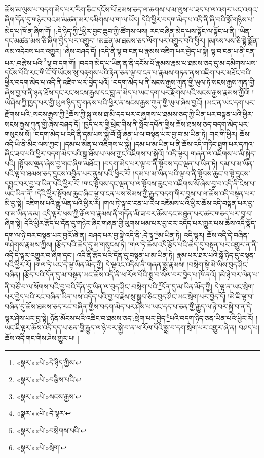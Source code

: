 ཆོས་མ་ལུས་པ་བདག་མེད་པར་རིག་ཅིང་དངོས་པོ་ཐམས་ཅད་ལ་ཆགས་པ་མ་ལུས་པ་ཟད་པ་ལ་འགར་ཡང་འགའ་ཞིག་དོན་དུ་གཉེར་བའམ་མཚན་མར་དམིགས་པ་ག་ལ་ཡོད། དེའི་ཕྱིར་བདག་མེད་པ་འདི་ནི་ཞི་བའི་སྒོ་གཉིས་པ་མེད་པ་ཁོ་ན་ཞིག་གོ། །:དེ་ཉིད་ཀྱི་\footnote{«སྣར་»«པེ་»དེ་ཉིད་ཀྱིས་}ཕྱིར་བྱང་ཆུབ་ཀྱི་ཚོགས་ལས། རང་བཞིན་མེད་པས་སྟོང་ལ་སྟོང་པ་ནི། །ཡིན་དང་མཚན་མས་ཅི་ཞིག་བྱེད་པར་འགྱུར། །མཚན་མ་ཐམས་ཅད་ལོག་པར་འགྱུར་བའི་ཕྱིར། །མཁས་པས་ཅི་སྟེ་སྨོན་ལམ་འདེབས་པར་འགྱུར། །ཞེས་བཤད་དོ། །འདི་ནི་ལྟ་བ་ངན་པ་རྣམས་འཇིག་པར་བྱེད་པ་སྟེ། ལྟ་བ་ངན་པ་ནི་ངན་པར་:བརྩེས་པའི་\footnote{«སྣར་»«པེ་»བརྩིས་པའི་}ལྟ་བ་དག་གོ། །བདག་མེད་པ་ཡིན་ན་ནི་དངོས་པོ་རྣམས་རྣམ་པ་ཐམས་ཅད་དུ་མ་དམིགས་པས་དངོས་པོའི་རང་གི་ངོ་བོ་ཡོངས་སུ་བརྟགས་པའི་རྟེན་ཅན་ལྟ་བ་ངན་པ་རྣམས་གཏན་ནས་འཇིག་པར་མཐོང་བའི་ཕྱིར་བདག་མེད་པ་འདི་ནི་འཇིག་པར་བྱེད་པའོ། །བདག་མེད་པ་ནི་སངས་རྒྱས་ཀུན་གྱི་ཡུལ་ཏེ་སངས་རྒྱས་ཀུན་གྱི་ཞེས་བྱ་བ་ནི་ཉན་ཐོས་དང་རང་སངས་རྒྱས་དང་བླ་ན་མེད་པ་ཡང་དག་པར་རྫོགས་པའི་སངས་རྒྱས་རྣམས་ཀྱིའོ། །ཡེ་ཤེས་ཀྱི་ཁྱད་པར་གྱི་ཡུལ་ཉིད་དུ་གནས་པའི་ཕྱིར་ན་སངས་རྒྱས་ཀུན་གྱི་ཡུལ་ཞེས་བྱའོ། །ཡང་ན་ཡང་དག་པར་རྫོགས་པའི་:སངས་རྒྱས་ཀྱི་\footnote{«སྣར་»«པེ་»སངས་རྒྱས་}ཆོས་ཀྱི་སྐུ་ལས་ཐ་མི་དད་པར་བཞུགས་པ་ཐམས་ཅད་ཀྱི་ཡིན་པར་བསྟན་པའི་ཕྱིར་སངས་རྒྱས་ཀུན་གྱི་ཞེས་བཤད་དོ། །ཁྱད་པར་གྱི་ཕྲེང་གིས་ནི་སློབ་དཔོན་གྱིས་ཆོས་ཐམས་ཅད་བདག་མེད་པར་གསུངས་སོ། །བདག་མེད་པ་འདི་ནི་དམ་པས་སྐྱེ་བོ་བློ་ཞན་པ་ལ་བསྟན་པར་བྱ་བ་མ་ཡིན་ཏེ། གང་གི་ཕྱིར། ཆོས་འདི་ཡི་ནི་མིང་ལས་ཀྱང་། །དམ་པ་མིན་པ་འཇིགས་པ་སྐྱེ། །དམ་པ་མ་ཡིན་པ་ནི་ཆོས་འདི་གཏིང་ཐུག་པར་དཀའ་ཞིང་ཟབ་པའི་ཕྱིར་བདག་མེད་པའི་སྒྲ་ཐོས་པ་ལས་ཀྱང་འཇིགས་པ་སྐྱེའོ། །འདི་ལྟར། གཞན་ལ་འཇིགས་པ་མི་སྐྱེད་པའི། །སྟོབས་ལྡན་ཞེས་བྱ་གང་ཞིག་མཐོང་། །བདག་མེད་པར་ལྟ་བ་ནི་སྟོབས་དང་ལྡན་པ་ཡིན་ཏེ། དམ་པ་མ་ཡིན་པའི་ལྟ་བ་ཐམས་ཅད་དྲུངས་འབྱིན་པར་ནུས་པའི་ཕྱིར་རོ། །དམ་པ་མ་ཡིན་པའི་ལྟ་བ་ནི་སྟོབས་ཆུང་བ་སྟེ་དྲུངས་དབྱུང་བར་བྱ་བ་ཡིན་པའི་ཕྱིར་རོ། །གང་སྟོབས་དང་ལྡན་པ་ལ་སྟོབས་ཆུང་བ་འཇིགས་སོ་ཞེས་བྱ་བ་འདི་ནི་ངེས་པ་ཡང་ཡིན་ནོ། །དེའི་ཕྱིར་སྟོབས་ཆུང་ཞིང་ལྟ་བ་ངན་པས་སེམས་ཀྱི་རྒྱུད་བདག་གིར་བྱས་པ་ལ་ཆོས་འདི་བསྟན་པར་མི་བྱ་སྟེ། འཇིགས་པའི་རྒྱུ་ཡིན་པའི་ཕྱིར་རོ། །གལ་ཏེ་ལྟ་བ་ངན་པ་རིལ་འཇོམས་པའི་ཕྱིར་ཆོས་འདི་བསྟན་པར་བྱ་བ་མ་ཡིན་ནམ། འདི་ལྟར་ཕས་ཀྱི་རྒོལ་བ་རྣམས་ནི་གདོན་མི་ཟ་བར་ཆོས་དང་མཐུན་པར་ཚར་གཅད་པར་བྱ་བ་ཞིག་སྟེ། དེའི་ཕྱིར་རྩོད་པ་དོན་དུ་གཉེར་ཞིང་གཞན་གྱི་ལུགས་ཕམ་པར་བྱ་བར་འདོད་པར་གྱུར་པས་ཆོས་འདི་སྣོད་དག་ལ་ཉེ་བར་བསྟན་པར་བྱའོ་ཞེ་ན། བཤད་པར་བྱ་སྟེ་འདི་ནི་:དེ་ལྟ་\footnote{«སྣར་»«པེ་»དེ་ལྟར་}མ་ཡིན་ཏེ། འདི་ལྟར། ཆོས་འདི་དེ་བཞིན་གཤེགས་རྣམས་ཀྱིས། །རྩོད་པའི་ཆེད་དུ་མ་གསུངས་ཏེ། །གལ་ཏེ་ཆོས་འདི་རྩོད་པའི་ཆེད་དུ་བསྟན་པར་འགྱུར་ན་ནི་འདི་དེ་ལྟར་འགྱུར་བ་ཞིག་དང་། འདི་ནི་རྩོད་པའི་དོན་དུ་བསྟན་པ་མ་ཡིན་ཏེ། རྣམ་པར་ཐར་པའི་སྒོ་ཉིད་དུ་བསྟན་པའི་ཕྱིར་རོ། །གལ་ཏེ་ཡང་དེ་ལྟ་ཡིན་མོད་ཀྱི། དེ་ལྟའང་འདིས་ནི་གཞན་སྨྲ་རྣམས། །བསྲེག་སྟེ་མེ་ཡིས་བུད་ཤིང་བཞིན། །རྩོད་པའི་དོན་དུ་མ་བསྟན་ཡང་ཆོས་འདི་ནི་ཕ་རོལ་པོའི་སྨྲ་བ་སེལ་བར་བྱེད་པ་ཁོ་ནའོ། །མེ་ཉེ་བར་ལེན་པ་ནི་བཙོ་བ་ལ་སོགས་པའི་བྱ་བའི་དོན་དུ་ཡིན་ལ་བུད་ཤིང་:བསྲེག་པའི་\footnote{«སྣར་»«པེ་»བསྲེགས་པའི་}དོན་དུ་མ་ཡིན་མོད་ཀྱི། དེ་ལྟ་ན་ཡང་སྲེག་པར་བྱེད་པའི་རང་བཞིན་ཡིན་པས་འདོད་པའི་བྱ་བ་རྗེས་སུ་སྒྲུབ་ཅིང་བུད་ཤིང་ཡང་སྲེག་པར་བྱེད་དོ། །མེ་ཇི་ལྟ་བ་བཞིན་དུ་ཆོས་ཐམས་ཅད་རང་བཞིན་གྱིས་བདག་མེད་པར་ཤེས་པ་ཡང་དད་པ་ཅན་གྱི་རྒྱུད་ལ་ཉེ་བར་སྐྱེ་བ་ན་དེ་ལྟར་ཤེས་པར་བྱ་སྟེ། ཉོན་མོངས་པའི་འཆིང་བ་ཐམས་ཅད་:སྲེག་པར་བྱེད་\footnote{«སྣར་»«པེ་»སྲེག་}པའི་བདག་ཉིད་ཅན་ཡིན་པའི་ཕྱིར་རོ། །ཡང་ཇི་ལྟར་ཆོས་འདི་དད་པ་ཅན་གྱི་རྒྱུད་ལ་ཉེ་བར་སྐྱེ་བ་ན་ཕ་རོལ་པོའི་སྨྲ་བ་དག་སྲེག་པར་འགྱུར་ཞེ་ན། བཤད་པ། ཆོས་འདི་གང་གིས་ཤེས་གྱུར་པ། །
